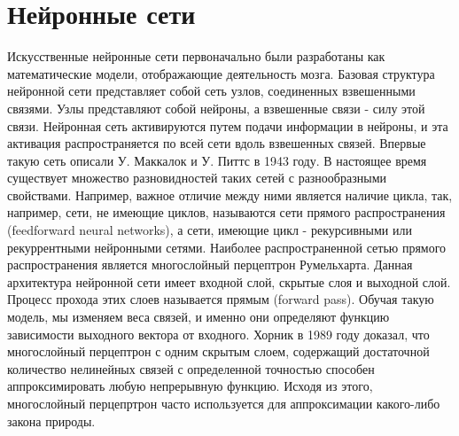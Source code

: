 \section{Нейронные сети}\label{ner_nextwork}
    Искусственные нейронные сети первоначально были разработаны как математические модели, отображающие деятельность мозга. Базовая структура нейронной сети представляет собой сеть узлов, соединенных взвешенными связями. Узлы представляют собой нейроны, а взвешенные связи - силу этой связи. Нейронная сеть активируются путем подачи информации в нейроны, и эта активация распространяется по всей сети вдоль взвешенных связей. Впервые такую сеть описали У. Маккалок и У. Питтс в 1943 году. В настоящее время существует множество разновидностей таких сетей с разнообразными свойствами. Например, важное отличие между ними является наличие цикла, так, например, сети, не имеющие циклов, называются сети прямого распространения (feedforward neural networks), а сети, имеющие цикл - рекурсивными или рекуррентными нейронными сетями. Наиболее распространенной сетью прямого распространения является многослойный перцептрон Румельхарта. Данная архитектура нейронной сети имеет входной слой, скрытые слоя и выходной слой. Процесс прохода этих слоев называется прямым (forward pass). Обучая такую модель, мы изменяем веса связей, и именно они определяют функцию зависимости выходного вектора от входного. Хорник в 1989 году доказал, что многослойный перцептрон с одним скрытым слоем, содержащий достаточной количество нелинейных связей с определенной точностью способен аппроксимировать любую непрерывную функцию. Исходя из этого, многослойный перцепртрон часто используется для аппроксимации какого-либо закона природы.
    
